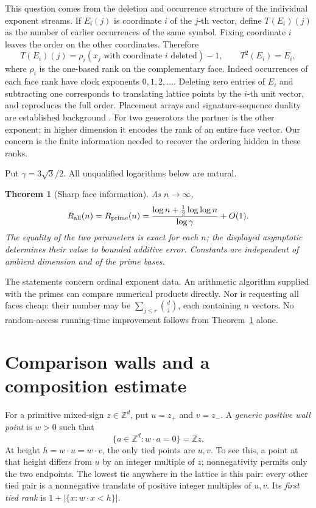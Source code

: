 \documentclass[11pt,a4paper]{article}
\newtheorem{theorem}{Theorem}
\theoremstyle{remark}\newtheorem{remark}[theorem]{Remark}
\newcommand{\ZZ}{\mathbb Z}
\newcommand{\card}[1]{\lvert#1\rvert}
\newcommand{\ga}{\gamma}
\begin{document}
This question comes from the deletion and occurrence structure of
the individual exponent streams. If \(E_i(j)\) is coordinate \(i\)
of the \(j\)-th vector, define \(T(E_i)(j)\) as the number of earlier
occurrences of the same symbol. Fixing coordinate \(i\) leaves the
order on the other coordinates. Therefore
\[
 T(E_i)(j)=\rho_i(x_j\text{ with coordinate }i\text{ deleted})-1,
 \qquad T^2(E_i)=E_i,
\]
where \(\rho_i\) is the one-based rank on the complementary face.
Indeed occurrences of each face rank have clock exponents
\(0,1,2,\ldots\). Deleting zero entries of \(E_i\) and subtracting
one corresponds to translating lattice points by the \(i\)-th unit
vector, and reproduces the full order. Placement arrays and
signature-sequence duality are established background
\cite{KB04,K22}. For two generators the partner is the other
exponent; in higher dimension it encodes the rank of an entire
face vector. Our concern is the finite information needed to
recover the ordering hidden in these ranks.

Put \(\ga=3\sqrt3/2\). All unqualified logarithms below are natural.

\begin{theorem}[Sharp face information]\label{thm:faces}
As \(n\to\infty\),
\[
 R_{\rm all}(n)=R_{\rm prime}(n)
 =\frac{\log n+\tfrac12\log\log n}{\log\ga}+O(1).
\]
The equality of the two parameters is exact for each \(n\);
the displayed asymptotic determines their value to bounded
additive error. Constants are independent of ambient dimension
and of the prime bases.
\end{theorem}

The statements concern ordinal exponent data. An arithmetic
algorithm supplied with the primes can compare numerical products
directly. Nor is requesting all faces cheap: their number may be
\(\sum_{j\le r}\binom dj\), each containing \(n\) vectors.
No random-access running-time improvement follows from
Theorem~\ref{thm:faces} alone.

\section{Comparison walls and a composition estimate}
For a primitive mixed-sign \(z\in\ZZ^d\), put \(u=z_+\) and
\(v=z_-\). A \emph{generic positive wall point} is \(w>0\) such that
\[
 \{a\in\ZZ^d:w\cdot a=0\}=\ZZ z.
\]
At height \(h=w\cdot u=w\cdot v\), the only tied points are
\(u,v\). To see this, a point at that height differs from \(u\)
by an integer multiple of \(z\); nonnegativity permits only the
two endpoints. The lowest tie anywhere in the lattice is this pair:
every other tied pair is a nonnegative translate of positive integer
multiples of \(u,v\).
Its \emph{first tied rank} is \(1+\card{\{x:w\cdot x<h\}}\).
\end{document}
